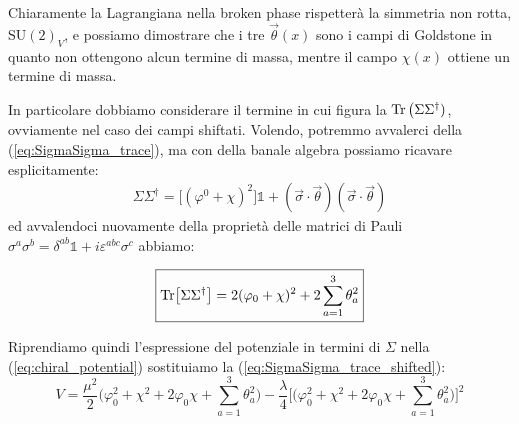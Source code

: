 \documentclass[../main.tex]{subfiles}
\begin{document}
Chiaramente la Lagrangiana nella broken phase rispetterà la simmetria non rotta, SU$(2)_V$, e possiamo dimostrare che i tre $\Vec\theta(x)$ sono i campi di Goldstone in quanto non ottengono alcun termine di massa, mentre il campo $\chi(x)$ ottiene un termine di massa.

In particolare dobbiamo considerare il termine in cui figura la $\Tr\big(\Sigma\Sigma^\dagger)$, ovviamente nel caso dei campi shiftati. Volendo, potremmo avvalerci della (\ref{eq:SigmaSigma_trace}), ma con della banale algebra possiamo ricavare esplicitamente:
\begin{align*}
    \Sigma\Sigma^\dagger = \big[(\varphi^0+\chi)^2\big]\mathbb1 + (\Vec\sigma\cdot\Vec\theta)(\Vec\sigma\cdot\Vec\theta)
\end{align*}
ed avvalendoci nuovamente della proprietà delle matrici di Pauli $\sigma^a\sigma^b = \delta^{ab}\mathbb1 + i\varepsilon^{abc}\sigma^c$ abbiamo:

\begin{equation}
    \boxed{{\Tr[\Sigma\Sigma^\dagger]} = 2(\varphi_0+\chi)^2 + 2\sum_{a=1}^3\theta_a^2}
    \label{eq:SigmaSigma_trace_shifted}
\end{equation}

Riprendiamo quindi l'espressione del potenziale in termini di $\Sigma$ nella (\ref{eq:chiral_potential}) sostituiamo la (\ref{eq:SigmaSigma_trace_shifted}):
\begin{equation}
    V = \frac{\mu^2}{2}\Big(\varphi_0^2+\chi^2 + 2\varphi_0\chi + \sum_{a=1}^3\theta_a^2\Big)-\frac{\lambda}{4}\Big[\big(\varphi_0^2+\chi^2 + 2\varphi_0\chi + \sum_{a=1}^3\theta_a^2\big)\Big]^2
    \label{eq:chiral_potential_shifted}
\end{equation}
\end{document}
